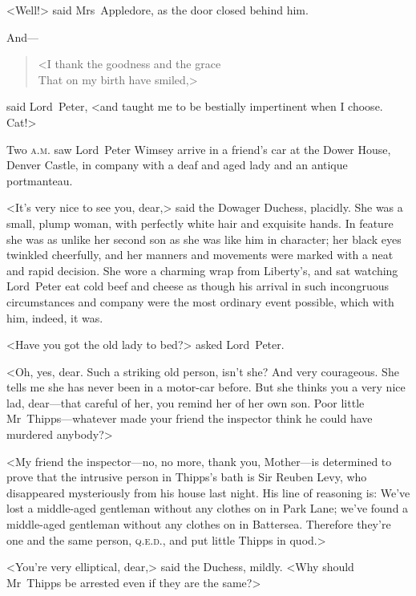<Well!> said Mrs~Appledore, as the door closed behind him.

And—

\begin{verse}
<I thank the goodness and the grace\\
That on my birth have smiled,>
\end{verse}

said Lord~Peter, <and taught me to be bestially impertinent when I choose. Cat!>

Two \textsc{a.m.} saw Lord~Peter Wimsey arrive in a friend's car at the Dower House, Denver Castle, in company with a deaf and aged lady and an antique portmanteau.

<It's very nice to see you, dear,> said the Dowager Duchess, placidly. She was a small, plump woman, with perfectly white hair and exquisite hands. In feature she was as unlike her second son as she was like him in character; her black eyes twinkled cheerfully, and her manners and movements were marked with a neat and rapid decision. She wore a charming wrap from Liberty's, and sat watching Lord~Peter eat cold beef and cheese as though his arrival in such incongruous circumstances and company were the most ordinary event possible, which with him, indeed, it was.

<Have you got the old lady to bed?> asked Lord~Peter.

<Oh, yes, dear. Such a striking old person, isn't she? And very courageous. She tells me she has never been in a motor-car before. But she thinks you a very nice lad, dear—that careful of her, you remind her of her own son. Poor little Mr~Thipps—whatever made your friend the inspector think he could have murdered anybody?>

<My friend the inspector—no, no more, thank you, Mother—is determined to prove that the intrusive person in Thipps's bath is Sir Reuben Levy, who disappeared mysteriously from his house last night. His line of reasoning is: We've lost a middle-aged gentleman without any clothes on in Park Lane; we've found a middle-aged gentleman without any clothes on in Battersea. Therefore they're one and the same person, \textsc{q.e.d.}, and put little Thipps in quod.>

<You're very elliptical, dear,> said the Duchess, mildly. <Why should Mr~Thipps be arrested even if they are the same?>

